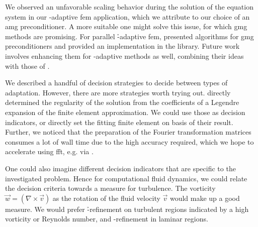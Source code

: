 We observed an unfavorable scaling behavior during the solution of the equation system in our \hp-adaptive \gls{fem} application, which we attribute to our choice of an \gls{amg} preconditioner. A more suitable one might solve this issue, for which \gls{gmg} methods are promising. For parallel \h-adaptive \gls{fem}, \textcite{clevenger2019} presented algorithms for \gls{gmg} preconditioners and provided an implementation in the \dealii{} library. Future work involves enhancing them for \hp-adaptive methods as well, combining their ideas with those of \textcite{mitchell2010}.



We described a handful of decision strategies to decide between types of adaptation. However, there are more strategies worth trying out.
\textcite{houston2003,houston2005} directly determined the regularity of the solution from the coefficients of a Legendre expansion of the finite element approximation. We could use those as decision indicators, or directly set the fitting finite element on basis of their result.
Further, we noticed that the preparation of the Fourier transformation matrices consumes a lot of wall time due to the high accuracy required, which we hope to accelerate using \gls{fft}, e.g. via \fftw{} \parencite{frigo2005,fftw338}.

One could also imagine different decision indicators that are specific to the investigated problem. Hence for computational fluid dynamics, we could relate the decision criteria towards a measure for turbulence. The vorticity $\vec{w} = (\nabla \times \vec{v})$ as the rotation of the fluid velocity $\vec{v}$ would make up a good measure. We would prefer \h-refinement on turbulent regions indicated by a high vorticity or Reynolds number, and \p-refinement in laminar regions.


